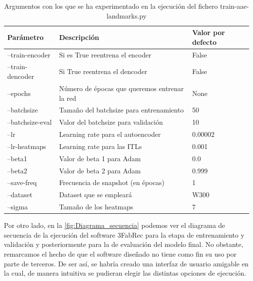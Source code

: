 \begin{table}[!h]
    \centering
    \caption{Argumentos con los que se ha experimentado en la ejecución del fichero train-aae-landmarks.py}
    \begin{tabular}{|l|l|l|}
    \hline
        Parámetro & Descripción & Valor por defecto \\ \hline
        --train-encoder & Si es True reentrena el encoder & False \\ \hline
        --train-dencoder & Si True reentrena el dencoder & False \\ \hline
        --epochs & Número de épocas que queremos entrenar la red & None \\ \hline
        --batchsize & Tamaño del batchsize para entrenamiento & 50 \\ \hline
        --batchsize-eval & Valor del batchsize para validación & 10 \\ \hline
        --lr & Learning rate para el autoencoder & 0.00002 \\ \hline
        --lr-heatmaps & Learning rate para las ITLs & 0.001 \\ \hline
        --beta1 & Valor de beta 1 para Adam & 0.0 \\ \hline
        --beta2 & Valor de beta 2 para Adam & 0.999 \\ \hline
        --save-freq & Frecuencia de snapshot (en épocas) & 1 \\ \hline
        --dataset & Dataset que se empleará & W300 \\ \hline
        --sigma & Tamaño de los heatmaps & 7 \\ \hline
    \end{tabular}
    \label{table:Params}
\end{table}

\medskip

\noindent Por otro lado, en la \autoref{fig:Diagrama_secuencia} podemos ver el diagrama de secuencia de la ejecución del software 3FabRec para la etapa de entrenamiento y validación y posteriormente para la de evaluación del modelo final. No obstante, remarcamos el hecho de que el software diseñado no tiene como fin su uso por parte de terceros. De ser así, se habría creado una interfaz de usuario amigable en la cual, de manera intuitiva se pudieran elegir las distintas opciones de ejecución.

\newpage

